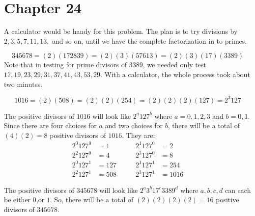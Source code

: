    \section*{Chapter 24}
    
\begin{Solution}{24.1}
A calculator would be handy for this problem. The plan is to try divisions by $2,3,5,7,11,13,$ and so on, until we have the complete factorization in to primes.

\[
345678 = (2)(172839) = (2)(3)(57613) = (2)(3)(17)(3389) 
\] 
Note that in testing for prime divisors of $3389$, we needed only test $17, 19, 23, 29, 31, 37, 41, 43, 53, 29$.
With a calculator, the whole process took about two minutes. 

\end{Solution}


\begin{Solution}{24.2}


\[
1016 = (2)(508) = (2)(2)(254)= (2)(2)(2)(127)= 2^{3}127
\]

\end{Solution}

\begin{Solution}{24.3}

The positive divisors of $1016$ will look like $2^{a}127^{b}$ where $a = 0,1,2,3$ and $b = 0,1$.
Since there are four choices for $a$ and two choices for $b$, there will be a total of $(4)(2) = 8$ positive divisors of $1016$. They are:
\begin{align*}
2^{0}127^{0} &= 1\qquad
&2^{1}127^{0} &= 2\\
2^{2}127^{0} &= 4\qquad
&2^{3}127^{0} &= 8\\
2^{0}127^{1} &= 127\qquad
&2^{1}127^{1} &= 254\\
2^{2}127^{1} &= 508\qquad
&2^{3}127^{1} &= 1016
\end{align*}

\end{Solution}

\begin{Solution}{24.4}
The positive divisors of $345678$ will look like $2^{a}3^{b}17^{c}3389^{d}$ where $a,b,c,d$ can each be either $0$,or $1$. So, there will be a total of $(2)(2)(2)(2) = 16$ positive divisors of $345678$.

\end{Solution}


